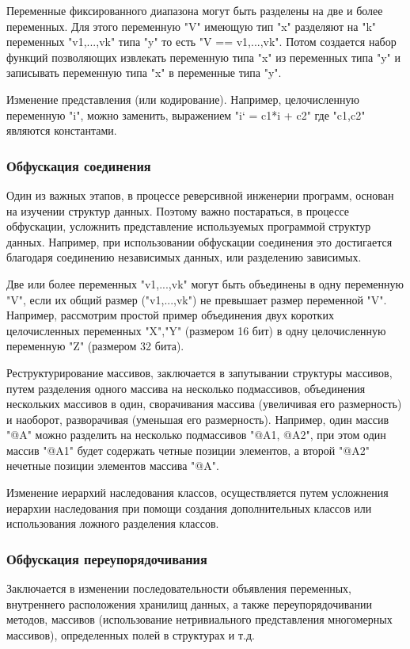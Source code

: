 Переменные фиксированного диапазона могут быть разделены на две и более переменных. Для этого переменную "V" имеющую тип "x" разделяют на "k" переменных "v1,...,vk" типа "y" то есть "V == v1,...,vk". Потом создается набор функций позволяющих извлекать переменную типа "x" из переменных типа "y" и записывать переменную типа "x" в переменные типа "y".

Изменение представления (или кодирование). Например, целочисленную переменную "i", можно заменить, выражением "i` = c1*i + c2" где "c1,c2" являются константами.

\subsubsection{Обфускация соединения}

Один из важных этапов, в процессе реверсивной инженерии программ, основан на изучении структур данных. Поэтому важно постараться, в процессе обфускации, усложнить представление используемых программой структур данных. Например, при использовании обфускации соединения это достигается благодаря соединению независимых данных, или разделению зависимых.

Две или более переменных "v1,...,vk" могут быть объединены в одну переменную "V", если их общий размер ("v1,...,vk") не превышает размер переменной "V". Например, рассмотрим простой пример объединения двух коротких целочисленных переменных "X","Y" (размером 16 бит) в одну целочисленную переменную "Z" (размером 32 бита).

Реструктурирование массивов, заключается в запутывании структуры массивов, путем разделения одного массива на несколько подмассивов, объединения нескольких массивов в один, сворачивания массива (увеличивая его размерность) и наоборот, разворачивая (уменьшая его размерность). Например, один массив "@A" можно разделить на несколько подмассивов "@A1, @A2", при этом один массив "@A1" будет содержать четные позиции элементов, а второй "@A2" нечетные позиции элементов массива "@A".

Изменение иерархий наследования классов, осуществляется путем усложнения иерархии наследования при помощи создания дополнительных классов или использования ложного разделения классов. 

\subsubsection{Обфускация переупорядочивания}
Заключается в изменении последовательности объявления переменных, внутреннего расположения хранилищ данных, а также переупорядочивании методов, массивов (использование нетривиального представления многомерных массивов), определенных полей в структурах и т.д. 

